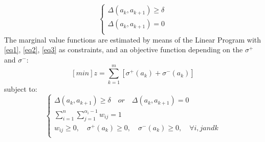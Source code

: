\documentclass{report}
\begin{document}
\begin{equation}\label{eq3}
\begin{cases}
\Delta (a_k, a_{k+1} ) \geq \delta\\
\Delta (a_k, a_{k+1} ) = 0 \\
\end{cases}
\end{equation}
The marginal value functions are estimated by means of the Linear Program with \eqref{eq1}, \eqref{eq2}, \eqref{eq3} as constraints, and an objective function depending on the $ \sigma^{+}$ and $\sigma^{-} $: 
$$ [min]z = \sum_{k=1}^{m} [ \sigma ^{+} (a_k) + \sigma ^{-} (a_k)] $$
subject to: 
\begin{equation}\label{eq5}
\begin{cases}
\Delta (a_k, a_{k+1} ) \geq \delta \quad or \quad \Delta (a_k, a_{k+1} ) = 0 \\
\sum_{i=1}^{n} \sum_{j=1}^{\alpha_i -1} w_{ij} = 1\\
w_{ij} \geq 0, \quad \sigma^{+}(a_k) \geq 0, \quad \sigma^{-}(a_k) \geq 0, \quad \forall i, j and k\\
\end{cases}
\end{equation}
\end{document}
